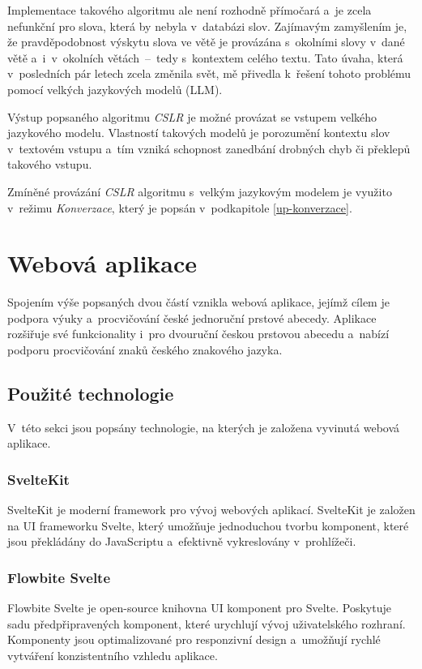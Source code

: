 \documentclass[
  master,
  program=ainfvs,
  biblatex,
  figures=true,
  tables=false,
  sourcecodes=true,
  glossaries,
  index
]{kidiplom}
\begin{document}
        Implementace takového algoritmu ale není rozhodně přímočará a~je zcela nefunkční pro slova, která by nebyla v~databázi slov. Zajímavým zamyšlením je, že pravděpodobnost výskytu slova ve větě je provázána s~okolními slovy v~dané větě a~i~v~okolních větách~--~tedy s~kontextem celého textu. Tato úvaha, která v~posledních pár letech zcela změnila svět, mě přivedla k~řešení tohoto problému pomocí velkých jazykových modelů (LLM).
        
        Výstup popsaného algoritmu \emph{CSLR} je možné provázat se vstupem velkého jazykového modelu. Vlastností takových modelů je porozumění kontextu slov v~textovém vstupu a~tím vzniká schopnost zanedbání drobných chyb či překlepů takového vstupu.

        Zmíněné provázání \emph{CSLR} algoritmu s~velkým jazykovým modelem je využito v~režimu \emph{Konverzace}, který je popsán v~podkapitole \ref{up-konverzace}.


\clearpage


\section{Webová aplikace} \label{webova-aplikace}
    Spojením výše popsaných dvou částí vznikla webová aplikace, jejímž cílem je podpora výuky a~procvičování české jednoruční prstové abecedy. Aplikace rozšiřuje své funkcionality i~pro dvouruční českou prstovou abecedu a~nabízí podporu procvičování znaků českého znakového jazyka.

    \subsection{Použité technologie}
        V~této sekci jsou popsány technologie, na kterých je založena vyvinutá webová aplikace.
        
        \subsubsection{SvelteKit}
            SvelteKit je moderní framework pro vývoj webových aplikací. SvelteKit je založen na UI frameworku Svelte, který umožňuje jednoduchou tvorbu komponent, které jsou překládány do JavaScriptu a~efektivně vykreslovány v~prohlížeči. \cite{svelte}
    
        \subsubsection{Flowbite Svelte}
            Flowbite Svelte je open-source knihovna UI komponent pro Svelte. Poskytuje sadu předpřipravených komponent, které urychlují vývoj uživatelského rozhraní. Komponenty jsou optimalizované pro responzivní design a~umožňují rychlé vytváření konzistentního vzhledu aplikace. \cite{flowbite}
        
\end{document}
